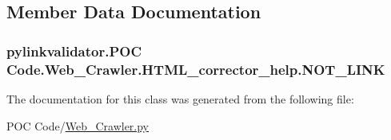 \subsection{Member Data Documentation}
\subsubsection[{N\+O\+T\+\_\+\+L\+I\+NK}]{\setlength{\rightskip}{0pt plus 5cm}pylinkvalidator.\+P\+OC Code.\+Web\+\_\+\+Crawler.\+H\+T\+M\+L\+\_\+corrector\+\_\+help.\+N\+O\+T\+\_\+\+L\+I\+NK}\hypertarget{classpylinkvalidator_1_1_p_o_c_01_code_1_1_web___crawler_1_1_h_t_m_l__corrector__help_a862769bf382fae597f7be261e69ebf0a}{}\label{classpylinkvalidator_1_1_p_o_c_01_code_1_1_web___crawler_1_1_h_t_m_l__corrector__help_a862769bf382fae597f7be261e69ebf0a}


The documentation for this class was generated from the following file\+:\begin{DoxyCompactItemize}
\item 
P\+O\+C Code/\hyperlink{_p_o_c_01_code_2_web___crawler_8py}{Web\+\_\+\+Crawler.\+py}\end{DoxyCompactItemize}

